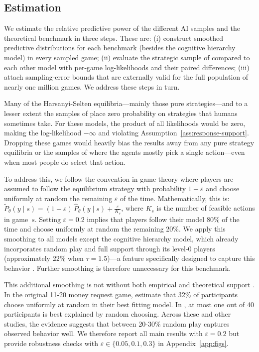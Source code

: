 \subsection{Estimation}
\label{sec:estimation}

We estimate the relative predictive power of the different AI samples and the theoretical benchmark in three steps.
These are: (i) construct smoothed predictive distributions for each benchmark (besides the cognitive hierarchy model) in every sampled game; 
(ii) evaluate the strategic sample of  compared to each other model with per-game log-likelihoods and their paired differences;
(iii) attach sampling-error bounds that are externally valid for the full population of nearly one million games.
We address these steps in turn.

Many of the Harsanyi-Selten equilibria---mainly those pure strategies---and to a lesser extent the samples of \aisub{} place zero probability on strategies that humans sometimes take.
For these models, the product of all likelihoods would be zero, making the log-likelihood $-\infty$ and violating Assumption~\ref{ass:response-support}.
Dropping these games would heavily bias the results away from any pure strategy equilibria or the samples of \aisub{} where the agents mostly pick a single action---even when most people do select that action. 

To address this, we follow the convention in game theory where players are assumed to follow the equilibrium strategy with probability $1-\varepsilon$ and choose uniformly at random the remaining $\varepsilon$ of the time.
Mathematically, this is: $\tilde P_{\theta}(y\mid s) = (1-\varepsilon)\,\hat P_{\theta}(y\mid s) + \frac{\varepsilon}{K_{s}}$, where $K_{s}$ is the number of feasible actions in game~$s$.
Setting $\varepsilon=0.2$ implies that players follow their model 80\% of the time and choose uniformly at random the remaining 20\%.
We apply this smoothing to all models except the cognitive hierarchy model, which already incorporates random play and full support through its level-0 players (approximately 22\% when $\tau = 1.5$)---a feature specifically designed to capture this behavior \citep{Camerer2004Cognitive}.
Further smoothing is therefore unnecessary for this benchmark.

This additional smoothing is not without both empirical and theoretical support \citep{mckelvey1992experimental,mckelvey1995quantal}.
In the original 11-20 money request game, \citeauthor{1120Arad2012} estimate that 32\% of participants choose uniformly at random in their best fitting model.
In \citeauthor{STAHL1994}, at most one out of 40 participants is best explained by random choosing.
Across these and other studies, the evidence suggests that between 20-30\% random play captures observed behavior well.
We therefore report all main results with $\varepsilon = 0.2$ but provide robustness checks with $\varepsilon \in \{0.05, 0.1, 0.3\}$ in Appendix~\ref{app:figs}.

